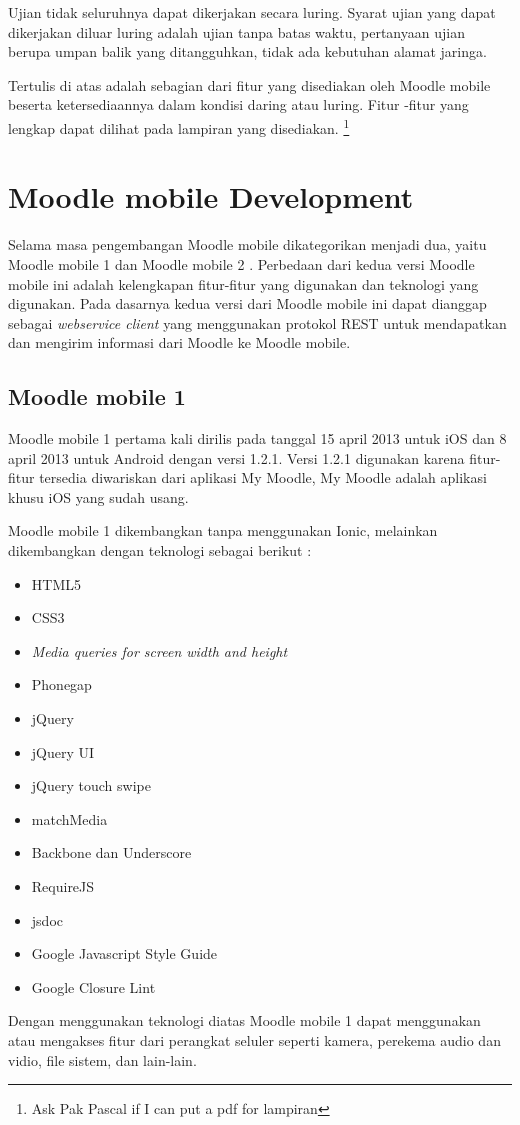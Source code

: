 \begin{enumerate}
			Ujian tidak seluruhnya dapat dikerjakan secara luring. Syarat ujian yang dapat dikerjakan diluar luring adalah ujian tanpa batas waktu, pertanyaan ujian berupa umpan balik yang ditangguhkan, tidak ada kebutuhan alamat jaringa. \cite{Moodlemobile:quiz:offline}
	\end{enumerate}
	
Tertulis di atas adalah sebagian dari fitur yang disediakan oleh Moodle mobile beserta ketersediaannya dalam kondisi daring atau luring. Fitur -fitur yang lengkap dapat dilihat pada lampiran yang disediakan. \footnote{Ask Pak Pascal if I can put a pdf for lampiran}

\section{Moodle mobile Development}
\label{sec:MoodleAppDev}

Selama masa pengembangan Moodle mobile dikategorikan menjadi dua, yaitu Moodle mobile 1 dan Moodle mobile 2 \cite{Moodlemobile:verhistory}. Perbedaan dari kedua versi Moodle mobile ini adalah kelengkapan fitur-fitur yang digunakan dan teknologi yang digunakan. Pada dasarnya kedua versi dari Moodle mobile ini dapat dianggap sebagai \textit{webservice client} yang menggunakan protokol REST untuk mendapatkan dan mengirim informasi dari Moodle ke Moodle mobile. 

\subsection{Moodle mobile 1}
 Moodle mobile 1 pertama kali dirilis pada tanggal 15 april 2013 untuk iOS dan 8 april 2013 untuk Android dengan versi 1.2.1. Versi 1.2.1 digunakan karena fitur-fitur tersedia diwariskan dari aplikasi My Moodle, My Moodle adalah aplikasi khusu iOS yang sudah usang.\cite{Moodlemobile:version1:intro}

Moodle mobile 1 dikembangkan tanpa menggunakan Ionic, melainkan dikembangkan dengan teknologi sebagai berikut : \cite{Moodlemobile:version1:tech}
	\begin{itemize}
		\item HTML5
		\item CSS3
		\item \textit{Media queries for screen width and height}
		\item Phonegap
		\item jQuery
		\item jQuery UI
		\item jQuery touch swipe
		\item matchMedia
		\item Backbone dan Underscore
		\item RequireJS
		\item jsdoc
		\item Google Javascript Style Guide
		\item Google Closure Lint
	\end{itemize}
Dengan menggunakan teknologi diatas Moodle mobile 1 dapat menggunakan atau mengakses fitur dari perangkat seluler seperti kamera, perekema audio dan vidio, file sistem, dan lain-lain.

